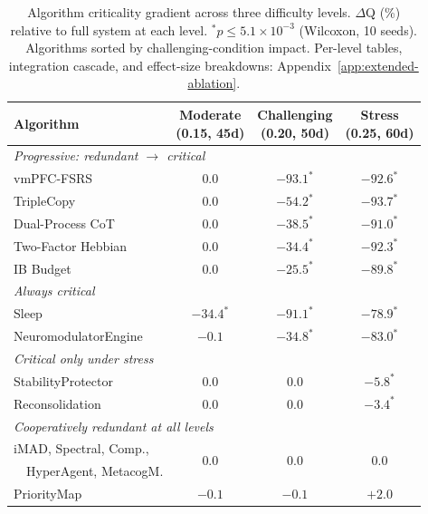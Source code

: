 \documentclass{article}
\begin{document}
\begin{table}[t]
    \caption{Algorithm criticality gradient across three difficulty levels.
    $\Delta$Q (\%) relative to full system at each level.
    $^\ast p \le 5.1\times 10^{-3}$ (Wilcoxon, 10 seeds).
    Algorithms sorted by challenging-condition impact.
    Per-level tables, integration cascade, and effect-size breakdowns:
    Appendix~\ref{app:extended-ablation}.}
    \label{tab:gradient}
    \centering
    \small
    \begin{tabular}{lccc}
        \toprule
        Algorithm & \makecell{Moderate\\(0.15, 45d)} & \makecell{Challenging\\(0.20, 50d)} & \makecell{Stress\\(0.25, 60d)} \\
        \midrule
        \multicolumn{4}{l}{\textit{Progressive: redundant $\to$ critical}} \\
        vmPFC-FSRS & $0.0$ & $-93.1^\ast$ & $-92.6^\ast$ \\
        TripleCopy & $0.0$ & $-54.2^\ast$ & $-93.7^\ast$ \\
        Dual-Process CoT & $0.0$ & $-38.5^\ast$ & $-91.0^\ast$ \\
        Two-Factor Hebbian & $0.0$ & $-34.4^\ast$ & $-92.3^\ast$ \\
        IB Budget & $0.0$ & $-25.5^\ast$ & $-89.8^\ast$ \\
        \midrule
        \multicolumn{4}{l}{\textit{Always critical}} \\
        Sleep & $-34.4^\ast$ & $-91.1^\ast$ & $-78.9^\ast$ \\
        NeuromodulatorEngine & $-0.1$ & $-34.8^\ast$ & $-83.0^\ast$ \\
        \midrule
        \multicolumn{4}{l}{\textit{Critical only under stress}} \\
        StabilityProtector & $0.0$ & $0.0$ & $-5.8^\ast$ \\
        Reconsolidation & $0.0$ & $0.0$ & $-3.4^\ast$ \\
        \midrule
        \multicolumn{4}{l}{\textit{Cooperatively redundant at all levels}} \\
        iMAD, Spectral, Comp., & \multirow{2}{*}{$0.0$} & \multirow{2}{*}{$0.0$} & \multirow{2}{*}{$0.0$} \\
        ~~HyperAgent, MetacogM. & & & \\
        PriorityMap & $-0.1$ & $-0.1$ & $+2.0$ \\
        \bottomrule
    \end{tabular}
\end{table}
\end{document}
